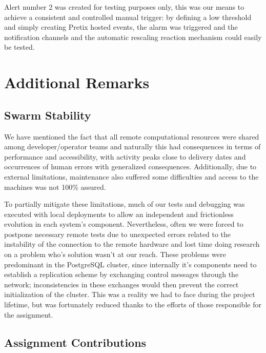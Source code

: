 \documentclass[12pt]{article}
\begin{document}
Alert number 2 was created for testing purposes only, this was our means to achieve a consistent and controlled manual trigger:
by defining a low threshold and simply creating Pretix hosted events, the alarm was triggered and the notification channels and the automatic rescaling reaction
mechanism could easily be tested.

\section{Additional Remarks} \label{remarks} %

\subsection{Swarm Stability} \label{remarks.stability} %

We have mentioned the fact that all remote computational resources were shared among developer/operator teams and naturally this had consequences in terms of 
performance and accessibility, with activity peaks close to delivery dates and occurrences of human errors with generalized consequences.
Additionally, due to external limitations, maintenance also suffered some difficulties and access to the machines was not 100\% assured.

To partially mitigate these limitations, much of our tests and debugging was executed with local deployments to allow an independent and frictionless evolution 
in each system's component.
Nevertheless, often we were forced to postpone necessary remote tests due to unexpected errors related to the instability of the connection to the remote 
hardware and lost time doing research on a problem who's solution wasn't at our reach.
These problems were predominant in the PostgreSQL cluster, since internally it's components need to establish a replication scheme by exchanging control messages
through the network; inconsistencies in these exchanges would then prevent the correct initialization of the cluster.
This was a reality we had to face during the project lifetime, but was fortunately reduced thanks to the efforts of those responsible for the assignment.

\subsection{Assignment Contributions} \label{remarks.contributions} %
\end{document}
